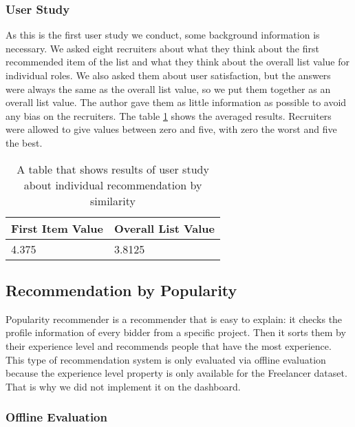 \subsubsection{User Study}\label{subsubsection:user-study-first}

As this is the first user study we conduct, some background information is necessary. We asked eight recruiters about what they think about the first recommended item of the list and what they think about the overall list value for individual roles. We also asked them about user satisfaction, but the answers were always the same as the overall list value, so we put them together as an overall list value. The author gave them as little information as possible to avoid any bias on the recruiters. The table \ref{tab:user-study-individual-rec-similarity} shows the averaged results. Recruiters were allowed to give values between zero and five, with zero the worst and five the best.

\begin{table}[ht]
	\caption[User Study Individual Similarity]{A table that shows results of user study about individual recommendation by similarity}\label{tab:user-study-individual-rec-similarity}
	\centering
	\begin{tabular}{l l}
		\toprule
		First Item Value & Overall List Value \\
		\midrule
		4.375 & 3.8125 \\
		\bottomrule
	\end{tabular}
\end{table}



\subsection{Recommendation by Popularity}\label{subsubsection:eval-popularity}

Popularity recommender is a recommender that is easy to explain: it checks the profile information of every bidder from a specific project. Then it sorts them by their experience level and recommends people that have the most experience. This type of recommendation system is only evaluated via offline evaluation because the experience level property is only available for the Freelancer dataset. That is why we did not implement it on the dashboard. 

\subsubsection{Offline Evaluation}

